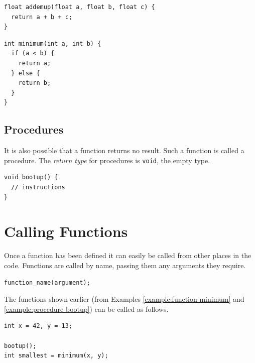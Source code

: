 \documentclass[11pt,fleqn]{book} %
\begin{document}
\begin{example}
	\phantom{ }
	\begin{verbatim}
float addemup(float a, float b, float c) {
  return a + b + c;
}
	\end{verbatim}
\end{example}

\begin{example}
	\label{example:function-minimum}
	\phantom{ }
	\begin{verbatim}
int minimum(int a, int b) {
  if (a < b) {
    return a;
  } else {
    return b;
  }
}
	\end{verbatim}
\end{example}

\subsection{Procedures}

It is also possible that a function returns no result. Such a function is called a procedure. The \emph{return type} for procedures is \texttt{void}, the empty type.

\begin{example}[Procedure]
	\label{example:procedure-bootup}
	\phantom{ }
	\begin{verbatim}
void bootup() {
  // instructions
}
	\end{verbatim}
\end{example}

\section{Calling Functions}
Once a function has been defined it can easily be called from other places in the code. Functions are called by name, passing them any arguments they require.

\begin{center}
	\texttt{function\_name(argument);}
\end{center}
\noindent
The functions shown earlier (from Examples \ref{example:function-minimum} and \ref{example:procedure-bootup}) can be called as follows.

\begin{example}
	\phantom{ }
	\begin{verbatim}
int x = 42, y = 13;

bootup();
int smallest = minimum(x, y);
	\end{verbatim}
\end{example}
\end{document}

